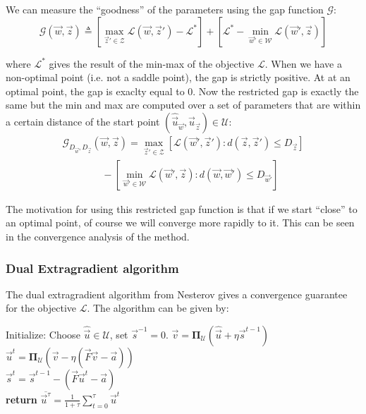 We can measure the ``goodness'' of the parameters using the gap function
$\mathcal{G}$:
\begin{equation}
  \mathcal{G}(\vec w, \vec z) \triangleq \left[ \max_{\vec z' \in \mathcal{Z}}
\mathcal{L}(\vec w,\vec z') - \mathcal{L}^* \right] + \left[ \mathcal{L}^* -
\min_{\vec w' \in \mathcal{W}} \mathcal{L}(\vec w', \vec z) \right]
\end{equation}

where $\mathcal{L}^*$ gives the result of the min-max of the objective
$\mathcal{L}$. When we have a non-optimal point (i.e. not a saddle point), the
gap is strictly positive. At at an optimal point, the gap is exaclty equal to 0.
Now the restricted gap is exactly the same but the min and max are computed over
a set of parameters that are within a certain distance of the start point
$(\hat{\vec u}_{\vec w},\hat{\vec u}_{\vec z}) \in \mathcal{U}$:
\begin{align}
    \mathcal{G}_{D_{\vec w}, D_{\vec z}}(\vec w, \vec z) = \max_{\vec z' \in
\mathcal{Z}} \left[ \mathcal{L}(\vec w', \vec z') : d(\vec z, \vec z') \leq
D_{\vec z} \right]\\ \quad\quad\quad\quad-\left [ \min_{\vec w' \in \mathcal{W}}
\mathcal{L}(\vec w',\vec z) : d(\vec w, \vec w') \leq D_{\vec w'} \right ]
\end{align}

The motivation for using this restricted gap function is that if we start
``close'' to an optimal point, of course we will converge more rapidly to it.
This can be seen in the convergence analysis of the method.

\subsubsection{Dual Extragradient algorithm}

The dual extragradient algorithm from Nesterov gives a convergence guarantee for
the objective $\mathcal{L}$. The algorithm can be given by:
\begin{algorithmic}
  \STATE Initialize: Choose $\hat{\vec u} \in \mathcal{U}$, set $\vec s^{-1} = 0$.
  \STATE $\vec v = \mathbf{\Pi}_{\mathcal{U}}(\hat{\vec u} + \eta \vec s^{t-1})$\\
  \STATE $\vec u^t = \mathbf{\Pi}_{\mathcal{U}}(\vec v - \eta (\vec F \vec v - \vec a))$\\
  \STATE $\vec s^t =  \vec s^{t-1} - (\vec F \vec u^t - \vec a)$
  \ENDFOR\\
  \STATE \textbf{return} $\overline{\vec u^{\tau}} = \frac{1}{1 + \tau} \sum_{t=0}^{\tau} \vec u^t$
\end{algorithmic}

